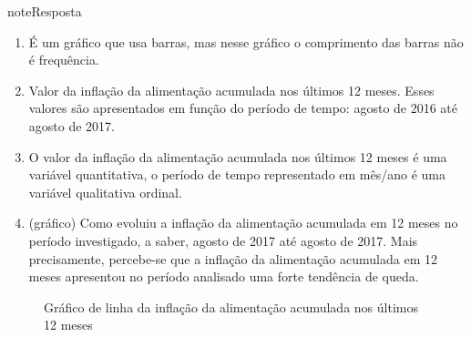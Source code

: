 \begin{sphinxadmonition}{note}{Resposta}
\begin{enumerate}
\item {} 
É um gráfico que usa barras, mas nesse gráfico o comprimento das barras não é frequência.

\item {} 
Valor da inflação da alimentação acumulada nos últimos 12 meses. Esses valores são apresentados em função do período de tempo: agosto de 2016 até agosto de 2017.

\item {} 
O valor da inflação da alimentação acumulada nos últimos 12 meses é uma variável quantitativa, o período de tempo representado em mês/ano é uma variável qualitativa ordinal.

\item {} 
(gráfico) Como evoluiu a inflação da alimentação acumulada em 12 meses no período investigado, a saber, agosto de 2017 até agosto de 2017. Mais precisamente, percebe-se que a inflação da alimentação acumulada em 12 meses apresentou no período analisado uma forte tendência de queda.

\end{enumerate}
\label{\detokenize{PE103-2:fig-grafico-de-linha-da-inflacao-alimentacao}}\begin{figure}[htp]\centering{}\caption{Gráfico de linha da inflação da alimentação acumulada nos últimos 12 meses}\end{figure}\end{sphinxadmonition}


